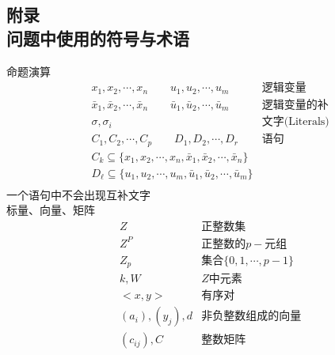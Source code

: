 \documentclass[twocolumn]{article}
\theoremstyle{nonumberplain}%
\begin{document}
    \begin{appendices}
      \section{附录\\
      问题中使用的符号与术语}
      \noindent 命题演算
      \begin{equation}\nonumber
      \begin{aligned}
        &x_1,x_2,\cdots,x_n \qquad u_1,u_2,\cdots,u_m & \text{逻辑变量}\\
        &\bar{x}_1,\bar{x}_2,\cdots,\bar{x}_n \qquad \bar{u}_1,\bar{u}_2,\cdots,\bar{u}_m & \text{逻辑变量的补}\\
        &\sigma,\sigma_i & \text{文字(Literals)}\\
        &C_1,C_2,\cdots,C_p \qquad D_1,D_2,\cdots,D_r & \text{语句}\\
        &C_k\subseteq \{x_1,x_2,\cdots,x_n,\bar{x}_1,\bar{x}_2,\cdots,\bar{x}_n\}\\
        &D_\ell\subseteq \{u_1,u_2,\cdots,u_m,\bar{u}_1,\bar{u}_2,\cdots,\bar{u}_m\}\\
      \end{aligned}
      \end{equation}
      一个语句中不会出现互补文字\\

      \noindent 标量、向量、矩阵
      \begin{equation}\nonumber
      \begin{aligned}
        &Z& \text{正整数集}\\
        &Z^P& \text{正整数的}p-\text{元组}\\
        &Z_p& \text{集合}\{0,1,\cdots,p-1\}\\
        &k,W& Z\text{中元素}\\
        &<x,y>& \text{有序对}\\
        &(a_i),(y_j),d& \text{非负整数组成的向量}\\
        &(c_{ij}),C& \text{整数矩阵}\\
      \end{aligned}
      \end{equation}
      \\


\end{appendices}
\end{document}
